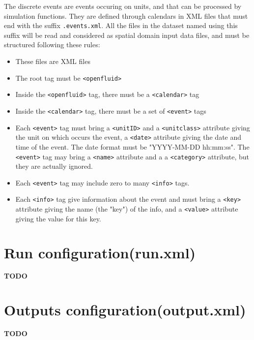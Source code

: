 The discrete events are events occuring on units, and that can be processed by simulation functions. 
\noindent They are defined through calendars in XML files that must end with the suffix \texttt{.events.xml}.
All the files in the dataset named using this suffix will be read and considered as spatial domain input data files, and must be
structured following these rules:
\begin{itemize}
  \item These files are XML files
  \item The root tag must be \texttt{<openfluid>}
  \item Inside the \texttt{<openfluid>} tag, there must be a \texttt{<calendar>} tag
  \item Inside the \texttt{<calendar>} tag, there must be a set of \texttt{<event>} tags 
  \item Each \texttt{<event>} tag must bring a \texttt{<unitID>} and a \texttt{<unitclass>} attribute giving the unit on which occurs the event, a \texttt{<date>} attribute giving the date and time of the event. The date format must be "YYYY-MM-DD hh:mm:ss". 
  The \texttt{<event>} tag may bring a \texttt{<name>} attribute and a a \texttt{<category>} attribute, but they are actually ignored.
  \item Each \texttt{<event>} tag may include zero to many \texttt{<info>} tags.
  \item Each \texttt{<info>} tag give information about the event and must bring a \texttt{<key>} attribute giving the name (the "key") of the info, and a \texttt{<value>} attribute giving the value for this key.        
\end{itemize}  
  

\bigskip

\section{Run configuration(run.xml)}

\textbf{TODO}


\bigskip

\section{Outputs configuration(output.xml)}

\textbf{TODO}


